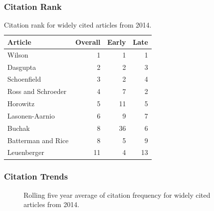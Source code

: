 \documentclass[
  10pt,
  letterpaper,
  DIV=11,
  numbers=noendperiod,
  twoside]{scrartcl}
\begin{document}
\subsubsection*{Citation Rank}\label{sec-rank-2014}

\begin{longtable}[]{@{}lrrr@{}}

\caption{\label{tbl-citation-rank-2014}Citation rank for widely cited
articles from 2014.}

\tabularnewline

\toprule\noalign{}
Article & Overall & Early & Late \\
\midrule\noalign{}
\endhead
\bottomrule\noalign{}
\endlastfoot
Wilson & 1 & 1 & 1 \\
Dasgupta & 2 & 2 & 3 \\
Schoenfield & 3 & 2 & 4 \\
Ross and Schroeder & 4 & 7 & 2 \\
Horowitz & 5 & 11 & 5 \\
Lasonen-Aarnio & 6 & 9 & 7 \\
Buchak & 8 & 36 & 6 \\
Batterman and Rice & 8 & 5 & 9 \\
Leuenberger & 11 & 4 & 13 \\

\end{longtable}

\subsubsection*{Citation Trends}\label{sec-trends-2014}

\begin{figure}


\caption{\label{fig-citation-spaghetti-2014}Rolling five year average of
citation frequency for widely cited articles from 2014.}

\end{figure}%
\end{document}
